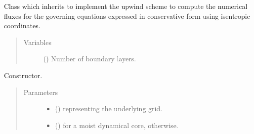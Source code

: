 \documentclass[letterpaper,10pt,english]{sphinxmanual}
\begin{document}

\begin{fulllineitems}
\label{\detokenize{api:dycore.flux_isentropic_upwind.FluxIsentropicUpwind}}
Class which inherits {\hyperref[\detokenize{api:dycore.flux_isentropic.FluxIsentropic}]{}} to implement the upwind scheme to compute
the numerical fluxes for the governing equations expressed in conservative form using isentropic coordinates.
\begin{quote}\begin{description}
\item[{Variables}] \leavevmode
{\hyperref[\detokenize{api:dycore.prognostic_isentropic.PrognosticIsentropic.nb}]{}} () \textendash{} Number of boundary layers.

\end{description}\end{quote}

\begin{fulllineitems}
\label{\detokenize{api:dycore.flux_isentropic_upwind.FluxIsentropicUpwind.__init__}}
Constructor.
\begin{quote}\begin{description}
\item[{Parameters}] \leavevmode\begin{itemize}
\item {} 
 () \textendash{} {\hyperref[\detokenize{api:grids.grid_xyz.GridXYZ}]{}} representing the underlying grid.

\item {} 
 () \textendash{}  for a moist dynamical core,  otherwise.

\end{itemize}

\end{description}\end{quote}


\end{fulllineitems}
\end{fulllineitems}
\end{document}

